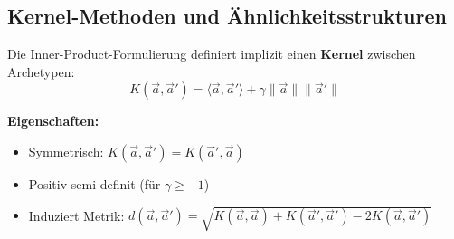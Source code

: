 \subsection{Kernel-Methoden und Ähnlichkeitsstrukturen}

\begin{tcolorbox}[colback=gray!5!white, colframe=gray!75!black,
    title=\textbf{Definition: Archetyp-Kernel}]

Die Inner-Product-Formulierung definiert implizit einen \textbf{Kernel} zwischen Archetypen:
\begin{equation}
K(\vec{a}, \vec{a}') = \langle \vec{a}, \vec{a}' \rangle + \gamma \|\vec{a}\| \|\vec{a}'\|
\end{equation}

\textbf{Eigenschaften:}
\begin{itemize}[nosep]
    \item Symmetrisch: $K(\vec{a}, \vec{a}') = K(\vec{a}', \vec{a})$
    \item Positiv semi-definit (für $\gamma \geq -1$)
    \item Induziert Metrik: $d(\vec{a}, \vec{a}') = \sqrt{K(\vec{a}, \vec{a}) + K(\vec{a}', \vec{a}') - 2K(\vec{a}, \vec{a}')}$
\end{itemize}

\end{tcolorbox}


